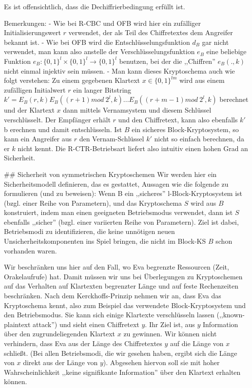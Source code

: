 \documentclass[a4paper]{article}
\begin{document}
\begin{multicols}{3}
        Es ist offensichtlich, dass die Dechiffrierbedingung erfüllt ist.

        Bemerkungen:
        - Wie bei R-CBC und OFB wird hier ein zufälliger Initialisierungswert $r$ verwendet, der als Teil des Chiffretextes dem Angreifer bekannt ist.
        - Wie bei OFB wird die Entschlüsselungsfunktion $d_B$ gar nicht verwendet, man kann also anstelle der Verschlüsselungsfunktion $e_B$ eine beliebige Funktion $e_B:\{0,1\}^l\times\{0,1\}^l\rightarrow\{0,1\}^l$ benutzen, bei der die ,,Chiffren'' $e_B(.,k)$ nicht einmal injektiv sein müssen.
        - Man kann dieses Kryptoschema auch wie folgt verstehen: Zu einem gegebenen Klartext $x\in\{0,1\}^{lm}$ wird aus einem zufälligen Initialwert $r$ ein langer Bitstring $k′=E_B(r,k) E_B((r+1) mod\ 2^l,k)... E_B((r+m-1) mod\ 2^l,k)$ berechnet und der Klartext $x$ dann mittels Vernamsystem und diesem Schlüssel verschlüsselt. Der Empfänger erhält $r$ und den Chiffretext, kann also ebenfalls $k′$ b erechnen und damit entschlüsseln. Ist $B$ ein sicheres Block-Kryptosystem, so kann ein Angreifer aus $r$ den Vernam-Schlüssel $k′$ nicht so einfach berechnen, da er $k$ nicht kennt. Die R-CTR-Betriebsart liefert also intuitiv einen hohen Grad an Sicherheit.

        ## Sicherheit von symmetrischen Kryptoschemen
        Wir werden hier ein Sicherheitsmodell definieren, das es gestattet, Aussagen wie die folgende zu formulieren (und zu beweisen): Wenn B ein ,,sicheres'' l-Block-Kryptosystem ist (bzgl. einer Reihe von Parametern), und das Kryptoschema $S$ wird aus $B$ konstruiert, indem man einen geeigneten Betriebsmodus verwendet, dann ist $S$ ebenfalls ,,sicher'' (bzgl. einer variierten Reihe von Parametern). Ziel ist dabei, Betriebsmodi zu identifizieren, die keine unnötigen neuen Unsicherheitskomponenten ins Spiel bringen, die nicht im Block-KS
    $B$ schon vorhanden waren.

        Wir beschränken uns hier auf den Fall, wo Eva begrenzte Ressourcen (Zeit, Orakelaufrufe) hat. Damit müssen wir uns bei Überlegungen zu Kryptoschemen auf das Verhalten auf Klartexten begrenzter Länge und auf feste Rechenzeiten beschränken. Nach dem Kerckhoffs-Prinzip nehmen wir an, dass Eva das Kryptoschema kennt, also zum Beispiel das verwendete Block-Kryptosystem und den Betriebsmodus. Sie kann sich einige Klartexte verschlüsseln lassen (,,known-plaintext attack'') und sieht einen Chiffretext $y$. Ihr Ziel ist, aus $y$ Information über den zugrundeliegenden Klartext $x$ zu gewinnen. Wir können nicht verhindern, dass Eva aus der Länge des Chiffretextes $y$ auf die Länge von $x$ schließt. (Bei allen Betriebsmodi, die wir gesehen haben, ergibt sich die Länge von $x$ direkt aus der Länge von $y$). Abgesehen hiervon soll sie mit hoher Wahrscheinlichkeit ,,keine signifikante Information'' über den Klartext erhalten können.


\end{multicols}
\end{document}
